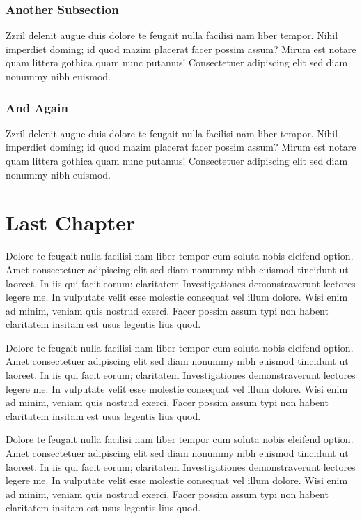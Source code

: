 \documentclass[a4paper,12pt]{scrartcl}
\begin{document}
\subsubsection{Another Subsection}
Zzril delenit augue duis dolore te feugait nulla facilisi nam liber tempor. Nihil imperdiet doming; id quod mazim placerat facer possim assum? Mirum est notare quam littera gothica quam nunc putamus! Consectetuer adipiscing elit sed diam nonummy nibh euismod.

\subsubsection{And Again}
Zzril delenit augue duis dolore te feugait nulla facilisi nam liber tempor. Nihil imperdiet doming; id quod mazim placerat facer possim assum? Mirum est notare quam littera gothica quam nunc putamus! Consectetuer adipiscing elit sed diam nonummy nibh euismod.

\section{Last Chapter}
Dolore te feugait nulla facilisi nam liber tempor cum soluta nobis eleifend option. Amet consectetuer adipiscing elit sed diam nonummy nibh euismod tincidunt ut laoreet. In iis qui facit eorum; claritatem Investigationes demonstraverunt lectores legere me. In vulputate velit esse molestie consequat vel illum dolore. Wisi enim ad minim, veniam quis nostrud exerci. Facer possim assum typi non habent claritatem insitam est usus legentis lius quod.

Dolore te feugait nulla facilisi nam liber tempor cum soluta nobis eleifend option. Amet consectetuer adipiscing elit sed diam nonummy nibh euismod tincidunt ut laoreet. In iis qui facit eorum; claritatem Investigationes demonstraverunt lectores legere me. In vulputate velit esse molestie consequat vel illum dolore. Wisi enim ad minim, veniam quis nostrud exerci. Facer possim assum typi non habent claritatem insitam est usus legentis lius quod.

Dolore te feugait nulla facilisi nam liber tempor cum soluta nobis eleifend option. Amet consectetuer adipiscing elit sed diam nonummy nibh euismod tincidunt ut laoreet. In iis qui facit eorum; claritatem Investigationes demonstraverunt lectores legere me. In vulputate velit esse molestie consequat vel illum dolore. Wisi enim ad minim, veniam quis nostrud exerci. Facer possim assum typi non habent claritatem insitam est usus legentis lius quod.
\end{document}
